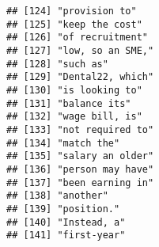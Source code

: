 \documentclass[]{article}
\begin{document}
\begin{verbatim}
## [124] "provision to"                                                                                                                             
## [125] "keep the cost"                                                                                                                            
## [126] "of recruitment"                                                                                                                           
## [127] "low, so an SME,"                                                                                                                          
## [128] "such as"                                                                                                                                  
## [129] "Dental22, which"                                                                                                                          
## [130] "is looking to"                                                                                                                            
## [131] "balance its"                                                                                                                              
## [132] "wage bill, is"                                                                                                                            
## [133] "not required to"                                                                                                                          
## [134] "match the"                                                                                                                                
## [135] "salary an older"                                                                                                                          
## [136] "person may have"                                                                                                                          
## [137] "been earning in"                                                                                                                          
## [138] "another"                                                                                                                                  
## [139] "position."                                                                                                                                
## [140] "Instead, a"                                                                                                                               
## [141] "first-year"                                                                                                                               

\end{verbatim}
\end{document}
